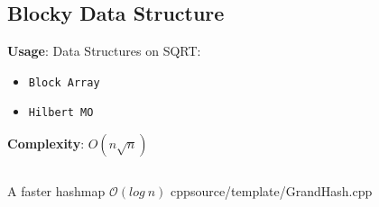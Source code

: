 \subsection{Blocky Data Structure}
{\textbf{Usage}: Data Structures on SQRT: 
\begin{itemize}
    \item \texttt{Block Array}
    \item \texttt{Hilbert MO}
\end{itemize}
}
{\textbf{Complexity}: $O(n\sqrt{n})$}
\inputminted[]{cpp}{source/template/BlockyArray.cpp}


{A faster hashmap}
{$\mathcal{O}(log \ n)$}
{cpp}{source/template/GrandHash.cpp}